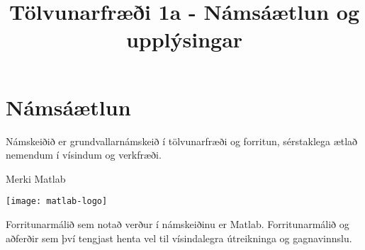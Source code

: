 \documentclass[justified, nobib]{tufte-handout}
\title{Tölvunarfræði 1a  \semester - Námsáætlun og upplýsingar}
\begin{document}
\section{Námsáætlun}
\label{sec:schedule}

Námskeiðið er grundvallarnámskeið í tölvunarfræði og forritun, sérstaklega ætlað nemendum í vísindum og verkfræði.

\begin{marginfigure}
\caption{Merki Matlab}
\begin{center}
\texttt{[image: matlab-logo]}
\end{center}
\end{marginfigure}

Forritunarmálið sem notað verður í námskeiðinu er Matlab. Forritunarmálið og aðferðir sem því tengjast henta vel til vísindalegra útreikninga og gagnavinnslu.
\end{document}
